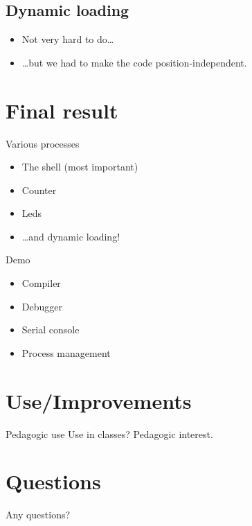\documentclass{beamer}
\begin{document}
    \subsection{Dynamic loading}
      \begin{frame}
        \begin{itemize}
          \item Not very hard to do\dots
          \item \dots but we had to make the code position-independent.
        \end{itemize}
      \end{frame}

  \section{Final result}
    \begin{frame}{Various processes}
      \begin{itemize}
        \item The shell (most important)
        \item Counter
        \item Leds
        \item \dots and dynamic loading!
      \end{itemize}
    \end{frame}

    \begin{frame}{Demo}
      \begin{itemize}
        \item Compiler
        \item Debugger
        \item Serial console
        \item Process management
      \end{itemize}
    \end{frame}

  \section{Use/Improvements}
    \begin{frame}{Pedagogic use}
        Use in classes? Pedagogic interest.
    \end{frame}

  \section{Questions}
    \begin{frame}
      Any questions?
    \end{frame}
\end{document}

